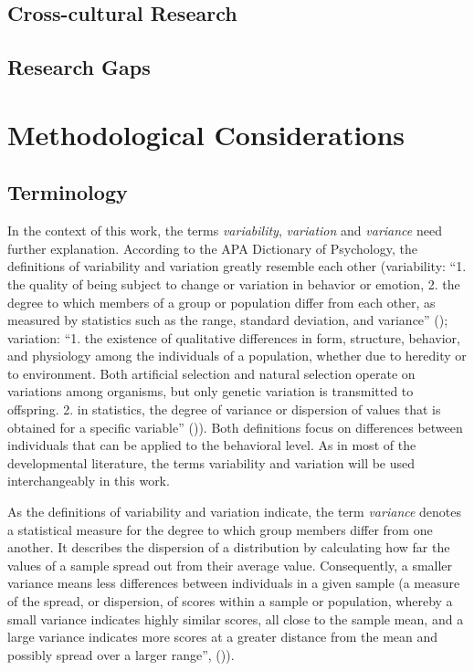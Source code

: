 \documentclass[
]{scrbook}
\begin{document}
\subsection{Cross-cultural Research}\label{cross-cultural-research-1}

\subsection{Research Gaps}\label{research-gaps}

\section{Methodological Considerations}\label{methodological-considerations}

\subsection{Terminology}\label{terminology-2}

In the context of this work, the terms \emph{variability}, \emph{variation} and \emph{variance} need further explanation. According to the APA Dictionary of Psychology, the definitions of variability and variation greatly resemble each other (variability: ``1. the quality of being subject to change or variation in behavior or emotion, 2. the degree to which members of a group or population differ from each other, as measured by statistics such as the range, standard deviation, and variance'' (); variation: ``1. the existence of qualitative differences in form, structure, behavior, and physiology among the individuals of a population, whether due to heredity or to environment. Both artificial selection and natural selection operate on variations among organisms, but only genetic variation is transmitted to offspring. 2. in statistics, the degree of variance or dispersion of values that is obtained for a specific variable'' ()). Both definitions focus on differences between individuals that can be applied to the behavioral level. As in most of the developmental literature, the terms variability and variation will be used interchangeably in this work.

As the definitions of variability and variation indicate, the term \emph{variance} denotes a statistical measure for the degree to which group members differ from one another. It describes the dispersion of a distribution by calculating how far the values of a sample spread out from their average value. Consequently, a smaller variance means less differences between individuals in a given sample (a measure of the spread, or dispersion, of scores within a sample or population, whereby a small variance indicates highly similar scores, all close to the sample mean, and a large variance indicates more scores at a greater distance from the mean and possibly spread over a larger range'', ()).
\end{document}
